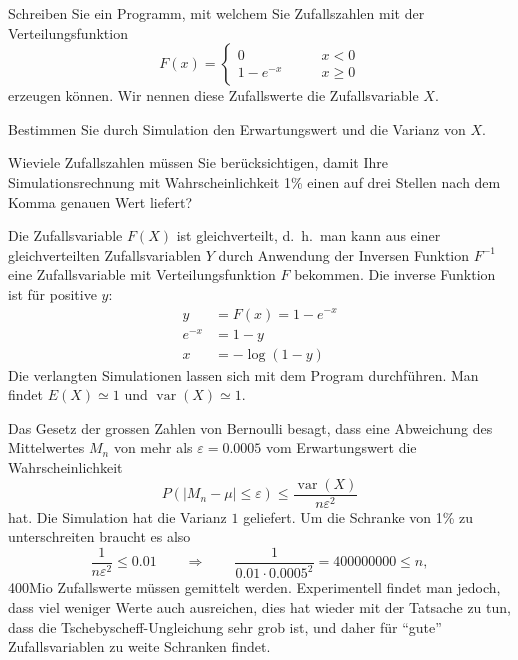 Schreiben Sie ein Programm, mit welchem Sie Zufallszahlen mit der
Verteilungsfunktion
\[
F(x)=\begin{cases}
0&\qquad x< 0\\
1-e^{-x}&\qquad x\ge 0
\end{cases}
\]
erzeugen können. Wir nennen diese Zufallswerte die Zufallsvariable $X$.
\begin{teilaufgaben}
\item Bestimmen Sie durch Simulation den Erwartungswert und die Varianz
von $X$.
\item Wieviele Zufallszahlen müssen Sie berücksichtigen, damit Ihre
Simulationsrechnung mit Wahrscheinlichkeit 1\% einen auf drei Stellen
nach dem Komma genauen Wert liefert?
\end{teilaufgaben}

\begin{loesung}
\begin{teilaufgaben}
\item Die Zufallsvariable $F(X)$ ist gleichverteilt, d.~h.~man kann aus
einer gleichverteilten Zufallsvariablen $Y$ durch Anwendung der Inversen
Funktion $F^{-1}$ eine Zufallsvariable mit Verteilungsfunktion $F$ bekommen.
Die inverse Funktion ist für positive $y$:
\begin{align*}
y&=F(x)=1-e^{-x}\\
e^{-x}&=1-y\\
x&=-\log(1-y)
\end{align*}
Die verlangten Simulationen lassen sich mit dem Program
durchführen. Man findet $E(X)\simeq 1$ und $\operatorname{var}(X)\simeq 1$.
\item
Das Gesetz der grossen Zahlen von Bernoulli besagt, dass 
eine Abweichung des Mittelwertes $M_n$ von mehr als $\varepsilon= 0.0005$
vom Erwartungswert die Wahrscheinlichkeit
\[
P(|M_n-\mu| \le \varepsilon)\le \frac{\operatorname{var}(X)}{n\varepsilon^2}
\]
hat. Die Simulation hat die Varianz $1$ geliefert.
Um die Schranke von 1\% zu unterschreiten braucht es also
\[
\frac1{n\varepsilon^2}\le 0.01
\qquad\Rightarrow\qquad
\frac1{0.01\cdot 0.0005^2}=400000000\le n,
\]
400Mio Zufallswerte müssen gemittelt werden. Experimentell findet man
jedoch, dass viel weniger Werte auch ausreichen, dies hat wieder mit der
Tatsache zu tun, dass die Tschebyscheff-Ungleichung sehr grob ist, und
daher für ``gute'' Zufallsvariablen zu weite Schranken findet.
\qedhere
\end{teilaufgaben}
\end{loesung}

